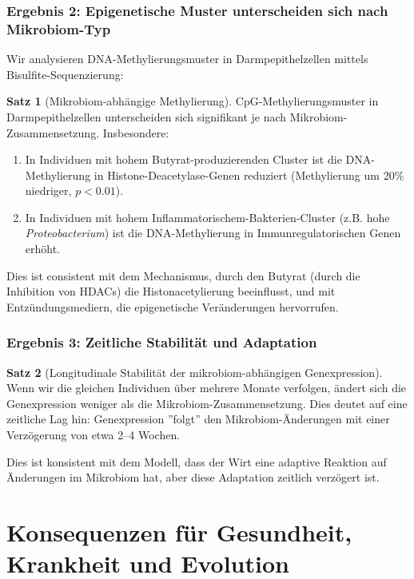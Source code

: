 \documentclass[a4paper,12pt]{article}
\theoremstyle{definition}
\newtheorem{satz}{Satz}
\begin{document}
\subsubsection{Ergebnis 2: Epigenetische Muster unterscheiden sich nach Mikrobiom-Typ}

Wir analysieren DNA-Methylierungsmuster in Darmpepithelzellen mittels Bisulfite-Sequenzierung:

\begin{satz}[Mikrobiom-abhängige Methylierung]
CpG-Methylierungsmuster in Darmpepithelzellen unterscheiden sich signifikant je nach Mikrobiom-Zusammensetzung. Insbesondere:

\begin{enumerate}
    \item In Individuen mit hohem Butyrat-produzierenden Cluster ist die DNA-Methylierung in Histone-Deacetylase-Genen reduziert (Methylierung um 20\% niedriger, $p < 0.01$).
    
    \item In Individuen mit hohem Inflammatorischem-Bakterien-Cluster (z.B. hohe \textit{Proteobacterium}) ist die DNA-Methylierung in Immunregulatorischen Genen erhöht.
\end{enumerate}

Dies ist consistent mit dem Mechanismus, durch den Butyrat (durch die Inhibition von HDACs) die Histonacetylierung beeinflusst, und mit Entzündungsmediern, die epigenetische Veränderungen hervorrufen.
\end{satz}

\subsubsection{Ergebnis 3: Zeitliche Stabilität und Adaptation}

\begin{satz}[Longitudinale Stabilität der mikrobiom-abhängigen Genexpression]
Wenn wir die gleichen Individuen über mehrere Monate verfolgen, ändert sich die Genexpression weniger als die Mikrobiom-Zusammensetzung. Dies deutet auf eine zeitliche Lag hin: Genexpression ''folgt'' den Mikrobiom-Änderungen mit einer Verzögerung von etwa 2--4 Wochen.

Dies ist konsistent mit dem Modell, dass der Wirt eine adaptive Reaktion auf Änderungen im Mikrobiom hat, aber diese Adaptation zeitlich verzögert ist.
\end{satz}

\section{Konsequenzen für Gesundheit, Krankheit und Evolution}
\end{document}
